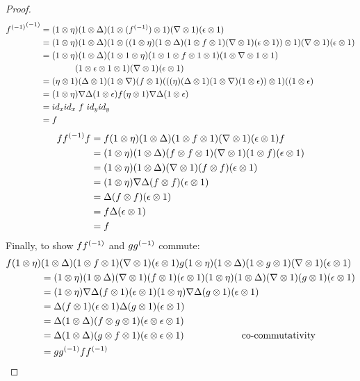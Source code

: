 \begin{proof}
  \begin{align*}
    {\ensuremath{{f}^{(-1)}}}^{(-1)} &=(1\otimes\eta)(1\otimes\Delta)(1\otimes({f}^{(-1)})\otimes1)(\nabla\otimes1)(\epsilon\otimes1) \\
    &=(1\otimes\eta)(1\otimes\Delta)(1\otimes((1\otimes\eta)(1\otimes\Delta)(1\otimes f\otimes1)(\nabla\otimes1)(\epsilon\otimes1))\otimes1)
      (\nabla\otimes1)(\epsilon\otimes1) \\
    &=(1\otimes\eta)(1\otimes\Delta)(1\otimes1\otimes\eta)(1\otimes1\otimes f\otimes1\otimes1)(1\otimes\nabla\otimes1\otimes1)\\
    &\qquad\qquad(1\otimes\epsilon\otimes1\otimes1) (\nabla\otimes1)(\epsilon\otimes1)\\
    &=(\eta\otimes1)(\Delta\otimes1)(1\otimes\nabla)(f\otimes1)(((\eta)(\Delta\otimes1)(1\otimes\nabla)(1\otimes\epsilon))\otimes1)
      ((1\otimes\epsilon)\\
    &=(1\otimes\eta)\nabla \Delta(1\otimes\epsilon)f(\eta\otimes1)\nabla\Delta(1\otimes\epsilon)\\
    &=id_{x}id_{x}\  f \ id_{y} id_{y}\\
    &=f
  \end{align*}
  \begin{align*}
    f{f}^{(-1)}f &= f(1\otimes\eta)(1\otimes\Delta)(1\otimes f\otimes1)(\nabla\otimes1)(\epsilon\otimes1)f\\
    &=(1\otimes\eta)(1\otimes\Delta)(f\otimes f\otimes1)(\nabla\otimes1)(1\otimes f)(\epsilon\otimes1)\\
    &=(1\otimes\eta)(1\otimes\Delta)(\nabla\otimes1)(f\otimes f)(\epsilon\otimes1)\\
    &=(1\otimes\eta)\nabla\Delta(f\otimes f)(\epsilon\otimes1)\\
    &=\Delta(f\otimes f)(\epsilon\otimes1)\\
    &=f\Delta(\epsilon\otimes1)\\
    &=f
  \end{align*}
  Finally, to show $f{f}^{(-1)}$ and $g{g}^{(-1)} $ commute:
  \begin{align*}
    f(1\otimes\eta)&(1\otimes\Delta)(1\otimes f\otimes1)(\nabla\otimes1)(\epsilon\otimes1)g(1\otimes\eta)(1\otimes\Delta)(1\otimes g\otimes1)
      (\nabla\otimes1)(\epsilon\otimes1)\\
    &=(1\otimes\eta)(1\otimes\Delta)(\nabla\otimes1)(f\otimes1)(\epsilon\otimes1)(1\otimes\eta)(1\otimes\Delta)(\nabla\otimes1)(g\otimes1)
      (\epsilon\otimes1)\\
    &=(1\otimes\eta)\nabla\Delta(f\otimes1)(\epsilon\otimes1)(1\otimes\eta)\nabla\Delta(g\otimes1)(\epsilon\otimes1)\\
    &=\Delta(f\otimes1)(\epsilon\otimes1)\Delta(g\otimes1)(\epsilon\otimes1)\\
    &=\Delta(1\otimes\Delta)(f\otimes g\otimes1)(\epsilon\otimes\epsilon\otimes1)\\
    &=\Delta(1\otimes\Delta)(g\otimes f\otimes1)(\epsilon\otimes\epsilon\otimes1)\qquad\qquad\qquad\text{co-commutativity}\\
    &=g{g}^{(-1)}f{f}^{(-1)}
  \end{align*}

\end{proof}

